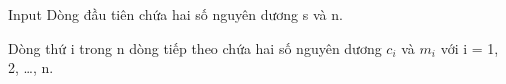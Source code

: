 Input
Dòng đầu tiên chứa hai số nguyên dương s và n.

Dòng thứ i trong n dòng tiếp theo chứa hai số nguyên dương $c_{i}$ và $m_{i}$ với i = 1, 2, …, n.